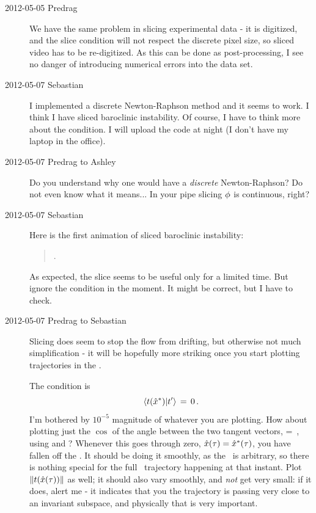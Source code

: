 \begin{description}
\item[2012-05-05 Predrag]                                   \toCB
We have the same problem in slicing experimental data - it is digitized,
and the slice condition will not respect the discrete pixel size, so
sliced video has to be re-digitized. As this can be done as
post-processing, I see no danger of introducing numerical errors into the
data set.


\item[2012-05-07 Sebastian]
I implemented a discrete Newton-Raphson method and it seems to work. I
think I have sliced baroclinic instability. Of course, I have to think
more about the {\chartBord} condition. I will upload the code at night
(I don't have my laptop in the office).

\item[2012-05-07 Predrag to Ashley] Do you understand why one would have a
\emph{discrete} Newton-Raphson? Do not even know what it means... In your pipe
slicing ${\bf \phi}$ is continuous, right?


\item[2012-05-07 Sebastian] Here is the first animation of sliced baroclinic
instability:

\begin{quote}
.
\end{quote}

As expected, the slice seems to be useful only for a limited time. But
ignore the {\chartBord} condition in the moment. It might be correct,
but I have to check.

\item[2012-05-07 Predrag to Sebastian] Slicing does seem to stop the flow
from drifting, but otherwise not much simplification - it will be
hopefully more striking once you start plotting trajectories in the \statesp.

The
{\chartBord} condition  is
\[ %
\braket{\groupTan(\sspRSing)}{\sliceTan{}} \,=\, 0
\,.
\] %
I'm bothered by $10^{-5}$ magnitude of whatever you are plotting. How about
plotting just the $\cos$ of the angle between the two tangent vectors,
\beq
\cos \theta = \frac{\Re
            \braket{\groupTan(\sspRSing(\zeit))}{\sliceTan{}}
                    }{
            \Norm{\groupTan(\sspRSing(\zeit))}\,\,{\Norm{\sliceTan{}}}
                    }
\,,
\label{chartBordAng}
\eeq
using  and ? Whenever this goes through zero,
$\hat{x}(\tau)=\hat{x}^\ast(\tau)$, you have fallen off the {\chartBord}.
It should be doing it smoothly, as the \template\ is arbitrary, so there
is nothing special for the full \statesp\ trajectory happening at that
instant. Plot $\|{t(\hat{x}(\tau))}\|$ as well; it should also
vary smoothly, and \emph{not} get very small: if it does, alert me - it indicates
that you the trajectory is passing very close to an invariant subspace,
and physically that is very important.


\end{description}
